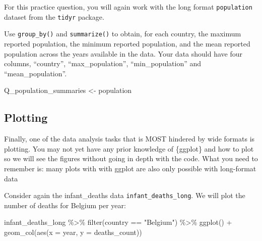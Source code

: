 \documentclass[
  letterpaper,
  DIV=11,
  numbers=noendperiod]{scrreprt}
\newenvironment{Shaded}{\begin{snugshade}}{\end{snugshade}}
\newcommand{\AttributeTok}[1]{\textcolor[rgb]{0.40,0.45,0.13}{#1}}
\newcommand{\FunctionTok}[1]{\textcolor[rgb]{0.28,0.35,0.67}{#1}}
\newcommand{\NormalTok}[1]{\textcolor[rgb]{0.00,0.23,0.31}{#1}}
\newcommand{\OtherTok}[1]{\textcolor[rgb]{0.00,0.23,0.31}{#1}}
\newcommand{\SpecialCharTok}[1]{\textcolor[rgb]{0.37,0.37,0.37}{#1}}
\newcommand{\StringTok}[1]{\textcolor[rgb]{0.13,0.47,0.30}{#1}}
\begin{document}
\begin{tcolorbox}[enhanced jigsaw, colframe=quarto-callout-tip-color-frame, rightrule=.15mm, opacityback=0, breakable, coltitle=black, colbacktitle=quarto-callout-tip-color!10!white, bottomrule=.15mm, leftrule=.75mm, toprule=.15mm, arc=.35mm, bottomtitle=1mm, colback=white, left=2mm, opacitybacktitle=0.6, titlerule=0mm, title=\textcolor{quarto-callout-tip-color}{\faLightbulb}\hspace{0.5em}{Practice}, toptitle=1mm]

For this practice question, you will again work with the long format
\texttt{population} dataset from the \texttt{tidyr} package.

Use \texttt{group\_by()} and \texttt{summarize()} to obtain, for each
country, the maximum reported population, the minimum reported
population, and the mean reported population across the years available
in the data. Your data should have four columns, ``country'',
``max\_population'', ``min\_population'' and ``mean\_population''.

\begin{Shaded}
\begin{Highlighting}[]
\NormalTok{Q\_population\_summaries }\OtherTok{\textless{}{-}} 
\NormalTok{  population}
\end{Highlighting}
\end{Shaded}

\end{tcolorbox}

\hypertarget{plotting}{%
\subsection{Plotting}\label{plotting}}

Finally, one of the data analysis tasks that is MOST hindered by wide
formats is plotting. You may not yet have any prior knowledge of
\{ggplot\} and how to plot so we will see the figures without going in
depth with the code. What you need to remember is: many plots with with
ggplot are also only possible with long-format data

Consider again the infant\_deaths data \texttt{infant\_deaths\_long}. We
will plot the number of deaths for Belgium per year:

\begin{Shaded}
\begin{Highlighting}[]
\NormalTok{infant\_deaths\_long }\SpecialCharTok{\%\textgreater{}\%} 
  \FunctionTok{filter}\NormalTok{(country }\SpecialCharTok{==} \StringTok{"Belgium"}\NormalTok{) }\SpecialCharTok{\%\textgreater{}\%} 
  \FunctionTok{ggplot}\NormalTok{() }\SpecialCharTok{+} 
  \FunctionTok{geom\_col}\NormalTok{(}\FunctionTok{aes}\NormalTok{(}\AttributeTok{x =}\NormalTok{ year, }\AttributeTok{y =}\NormalTok{ deaths\_count))}
\end{Highlighting}
\end{Shaded}
\end{document}

